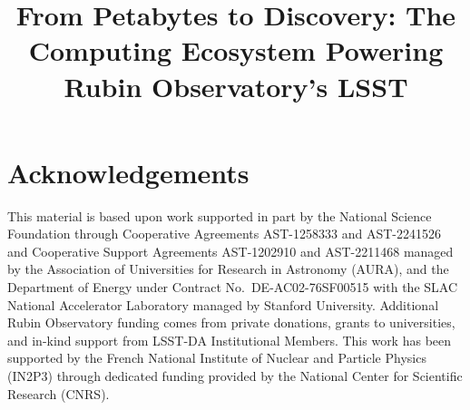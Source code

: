\documentclass{webofc}
\begin{document}
\title{From Petabytes to Discovery: The Computing Ecosystem Powering Rubin Observatory's LSST}




\abstract{}

\maketitle



\section*{Acknowledgements}

This material is based upon work supported in part by the National Science Foundation through Cooperative Agreements AST-1258333 and AST-2241526 and Cooperative Support Agreements AST-1202910 and AST-2211468 managed by the Association of Universities for Research in Astronomy (AURA), and the Department of Energy under Contract No.\ DE-AC02-76SF00515 with the SLAC National Accelerator Laboratory managed by Stanford University.
Additional Rubin Observatory funding comes from private donations, grants to universities, and in-kind support from LSST-DA Institutional Members.
This work has been supported by the French National Institute of Nuclear and Particle Physics (IN2P3) through dedicated funding provided by the National Center for Scientific Research (CNRS).



\end{document}
